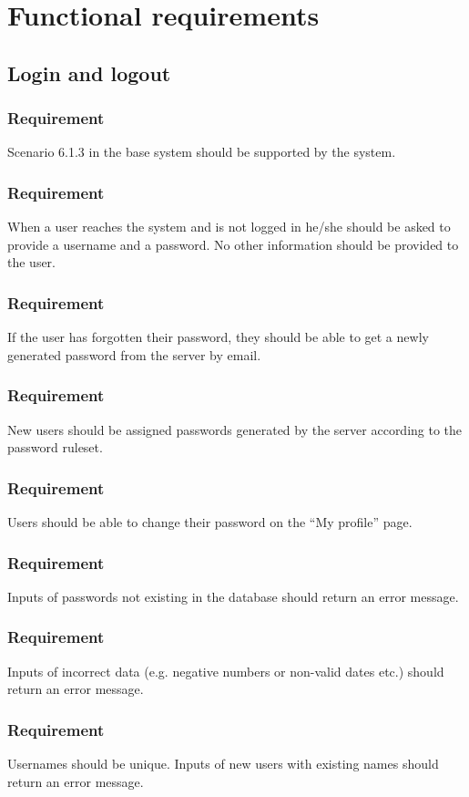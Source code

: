 \documentclass{article}
\begin{document}
\section{Functional requirements}
\subsection{Login and logout}
\subsubsection{Requirement}
Scenario 6.1.3 in the base system should be supported by the system.

\subsubsection{Requirement}
 When  a  user  reaches  the  system  and  is  not  logged  in he/she should be asked to provide a username and a password.  No other information should be provided to the user.


\subsubsection{Requirement}
If the user has forgotten their password, they should be able to get a newly generated password from the server by email.

\subsubsection{Requirement}
New users should be assigned passwords generated by the server according to the password ruleset.

\subsubsection{Requirement}
Users should be able to change their password on the “My profile” page.
\subsubsection{Requirement}
Inputs of passwords not existing in the database should return an error message.
\subsubsection{Requirement }
Inputs of incorrect data (e.g. negative numbers or non-valid dates etc.) should return an error message.
\subsubsection{Requirement }
Usernames should be unique. Inputs of new users with existing names should return an error message.
\end{document}
